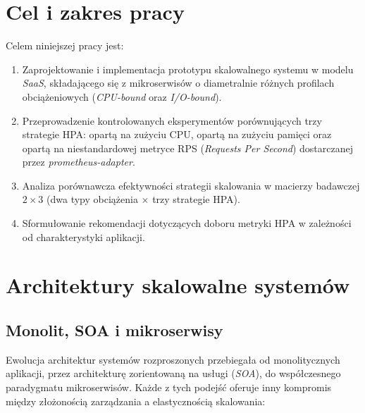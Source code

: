 \section{Cel i zakres pracy}

Celem niniejszej pracy jest:

\begin{enumerate}
  \item Zaprojektowanie i implementacja prototypu skalowalnego systemu w modelu \textit{SaaS}, składającego się z mikroserwisów o diametralnie różnych profilach obciążeniowych (\textit{CPU-bound} oraz \textit{I/O-bound}).
  \item Przeprowadzenie kontrolowanych eksperymentów porównujących trzy strategie HPA: opartą na zużyciu CPU, opartą na zużyciu pamięci oraz opartą na niestandardowej metryce RPS (\textit{Requests Per Second}) dostarczanej przez \textit{prometheus-adapter}.
  \item Analiza porównawcza efektywności strategii skalowania w macierzy badawczej $2 \times 3$ (dwa typy obciążenia $\times$ trzy strategie HPA).
  \item Sformułowanie rekomendacji dotyczących doboru metryki HPA w zależności od charakterystyki aplikacji.
\end{enumerate}

\section{Architektury skalowalne systemów}

\subsection{Monolit, SOA i mikroserwisy}

Ewolucja architektur systemów rozproszonych przebiegała od monolitycznych aplikacji, przez architekturę zorientowaną na usługi (\textit{SOA}), do współczesnego paradygmatu mikroserwisów. Każde z tych podejść oferuje inny kompromis między złożonością zarządzania a elastycznością skalowania:

